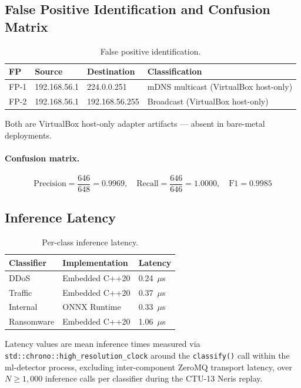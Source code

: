 \documentclass[11pt,a4paper]{article}
\begin{document}
\subsection{False Positive Identification and Confusion Matrix}

\begin{table}[h]
\centering
\caption{False positive identification.}
\label{tab:fps}
\begin{tabular}{llll}
\toprule
\textbf{FP} & \textbf{Source} & \textbf{Destination} & \textbf{Classification} \\
\midrule
FP-1 & 192.168.56.1 & 224.0.0.251     & mDNS multicast (VirtualBox host-only) \\
FP-2 & 192.168.56.1 & 192.168.56.255  & Broadcast (VirtualBox host-only) \\
\bottomrule
\end{tabular}
\end{table}

Both are VirtualBox host-only adapter artifacts --- absent in bare-metal deployments.

\paragraph{Confusion matrix.}
\[
  \text{Precision} = \frac{646}{648} = 0.9969, \quad
  \text{Recall}    = \frac{646}{646} = 1.0000, \quad
  \text{F1}        = 0.9985
\]

\subsection{Inference Latency}

\begin{table}[h]
\centering
\caption{Per-class inference latency.}
\label{tab:latency}
\begin{tabular}{lll}
\toprule
\textbf{Classifier} & \textbf{Implementation} & \textbf{Latency} \\
\midrule
DDoS        & Embedded C++20 & 0.24~$\mu$s \\
Traffic     & Embedded C++20 & 0.37~$\mu$s \\
Internal    & ONNX Runtime   & 0.33~$\mu$s \\
Ransomware  & Embedded C++20 & 1.06~$\mu$s \\
\bottomrule
\end{tabular}
\end{table}

Latency values are mean inference times measured via
\texttt{std::chrono::high\_resolution\_clock} around the \texttt{classify()} call within the
ml-detector process, excluding inter-component ZeroMQ transport latency, over $N \geq 1{,}000$
inference calls per classifier during the CTU-13 Neris replay.
\end{document}
